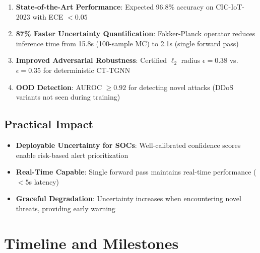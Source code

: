 \documentclass[11pt]{article}
\begin{document}
\begin{enumerate}[label=\textbf{E\arabic*.},leftmargin=*]
    \item \textbf{State-of-the-Art Performance}: Expected 96.8\% accuracy on CIC-IoT-2023 with ECE $< 0.05$

    \item \textbf{87\% Faster Uncertainty Quantification}: Fokker-Planck operator reduces inference time from 15.8s (100-sample MC) to 2.1s (single forward pass)

    \item \textbf{Improved Adversarial Robustness}: Certified $\ell_2$ radius $\epsilon = 0.38$ vs. $\epsilon = 0.35$ for deterministic CT-TGNN

    \item \textbf{OOD Detection}: AUROC $\geq 0.92$ for detecting novel attacks (DDoS variants not seen during training)
\end{enumerate}

\subsection{Practical Impact}

\begin{itemize}
    \item \textbf{Deployable Uncertainty for SOCs}: Well-calibrated confidence scores enable risk-based alert prioritization
    \item \textbf{Real-Time Capable}: Single forward pass maintains real-time performance ($< 5$s latency)
    \item \textbf{Graceful Degradation}: Uncertainty increases when encountering novel threats, providing early warning
\end{itemize}

\section{Timeline and Milestones}
\end{document}
